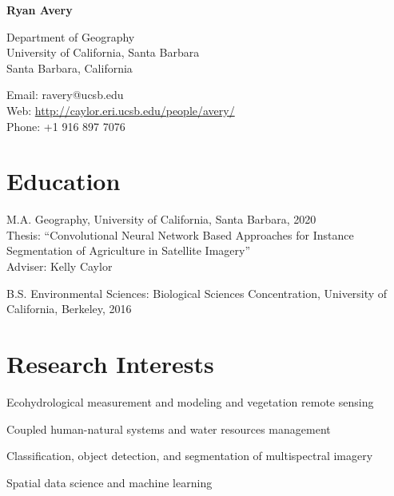 \documentclass[12pt,letterpaper]{report}
\newcommand{\myname}{Ryan Avery}
\newcommand{\namefont}[1]{{\normalfont\bfseries\Huge{#1}}}
\newcommand{\listitemspace}{0.15em}
\renewenvironment{itemize}
{\begin{list}{}{\setlength{\leftmargin}{0em}
			\setlength{\parskip}{0em}
			\setlength{\itemsep}{\listitemspace}
			\setlength{\parsep}{\listitemspace}}}
	{\end{list}}
\begin{document}
	\raggedright
	
	\namefont{\myname}
	
	\vspace{1em}
	\begin{minipage}[t]{0.495\textwidth}
		Department of Geography \\
		University of California, Santa Barbara \\
		Santa Barbara, California
	\end{minipage}
	\begin{minipage}[t]{0.495\textwidth}
		Email: ravery@ucsb.edu \\
		Web: \href{http://caylor.eri.ucsb.edu/people/avery/}{http://caylor.eri.ucsb.edu/people/avery/} \\
		Phone: +1 916 897 7076
	\end{minipage}
	\vspace{0.5em}
	
	
	
	\section*{Education}
	
	\begin{tablist}
		
		\item[M.A.] \tab Geography, University of California, Santa Barbara, 2020 \\
		Thesis: \enquote{Convolutional Neural Network Based Approaches for Instance Segmentation of Agriculture in Satellite Imagery} \\
		Adviser: Kelly Caylor 
		
		\item[B.S.]  \tab Environmental Sciences: Biological Sciences Concentration, University of California, Berkeley, 2016
		
	\end{tablist}	


	
	\section*{Research Interests}
	
	\begin{itemize}
		
		\item Ecohydrological measurement and modeling and vegetation remote sensing
		
		\item Coupled human-natural systems and water resources management 
		
		\item Classification, object detection, and segmentation of multispectral imagery
		
		\item Spatial data science and machine learning
		
	\end{itemize}
	
\end{document}

